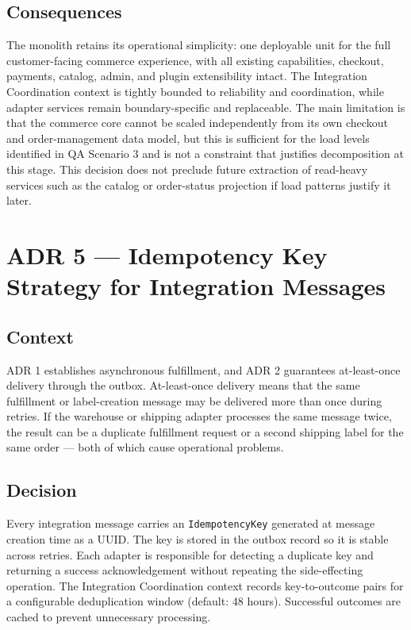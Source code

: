 \subsection{Consequences}

The monolith retains its operational simplicity: one deployable unit for the full
customer-facing commerce experience, with all existing capabilities, checkout, payments,
catalog, admin, and plugin extensibility intact. The Integration Coordination context is tightly
bounded to reliability and coordination, while adapter services remain boundary-specific and
replaceable. The main limitation is that the commerce core cannot be scaled independently from
its own checkout and order-management data model, but this is sufficient for the load levels
identified in QA Scenario 3 and is not a constraint that justifies decomposition at this stage.
This decision does not preclude future extraction of read-heavy services such as the catalog or
order-status projection if load patterns justify it later.

\section{ADR 5 --- Idempotency Key Strategy for Integration Messages}

\subsection{Context}

ADR 1 establishes asynchronous fulfillment, and ADR 2 guarantees at-least-once delivery
through the outbox. At-least-once delivery means that the same fulfillment or label-creation
message may be delivered more than once during retries. If the warehouse or shipping adapter
processes the same message twice, the result can be a duplicate fulfillment request or a
second shipping label for the same order --- both of which cause operational problems.

\subsection{Decision}

Every integration message carries an \texttt{IdempotencyKey} generated at message creation
time as a UUID. The key is stored in the outbox record so it is stable across retries. Each
adapter is responsible for detecting a duplicate key and returning a success acknowledgement
without repeating the side-effecting operation. The Integration Coordination context records
key-to-outcome pairs for a configurable deduplication window (default: 48 hours). Successful
outcomes are cached to prevent unnecessary processing.

